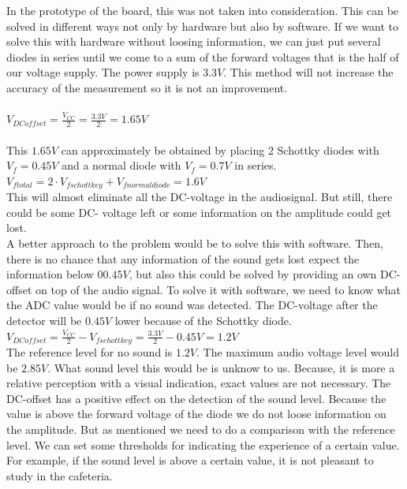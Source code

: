 \documentclass[11pt,a4paper]{article}
\begin{document}
 In the prototype of the board, this was not taken into consideration. This can be solved in different ways not only by hardware but also by software. If we want to solve this with hardware without loosing information, we can just put several diodes in series until we come to a sum of the forward voltages that is the half of our voltage supply. The power supply is $3.3 V$. This method will not increase the accuracy of the measurement so it is not an improvement. \\ \\
$V_{DC offset} = \frac{V_{CC}}{2}= \frac{3.3V}{2} = 1.65V$\\ \\
This $1.65 V$ can approximately be obtained by placing 2 Schottky diodes with $V_{f}=0.45 V$ and a normal diode with $V_{f} = 0.7 V$ in series.\\
$V_{f total} = 2\cdot V_{f schottkey} + V_{f normal diode} = 1.6 V$\\
This will almost eliminate all the DC-voltage in the audiosignal. But still, there could be some DC- voltage left or some information on the amplitude could get lost. \\
A better approach to the problem would be to solve this with software. Then, there is no chance that any information of the sound gets lost expect the information below 0$ 0.45 V$, but also this could be solved by providing an own DC-offset on top of the audio signal. To solve it with software, we need to know what the ADC value would be if no sound was detected. The DC-voltage after the detector will be $0.45 V$ lower because of the Schottky diode.\\
$V_{DC offset} = \frac{V_{CC}}{2}-V_{f schottkey}= \frac{3.3 V}{2}- 0.45 V = 1.2 V$ \\
The reference level for no sound is $1.2 V$. The maximum audio voltage level would be $2.85 V$. What sound level this would be is unknow to us. Because, it is more a relative perception with a visual indication, exact values are not necessary. The DC-offset has a positive effect on the detection of the sound level. Because the value is above the forward voltage of the diode we do not loose information on the amplitude. But as mentioned we need to do a comparison with the reference level. We can set some thresholds for indicating the experience of a certain value. For example, if the sound level is above a certain value, it is not pleasant to study in the cafeteria.
\end{document}
